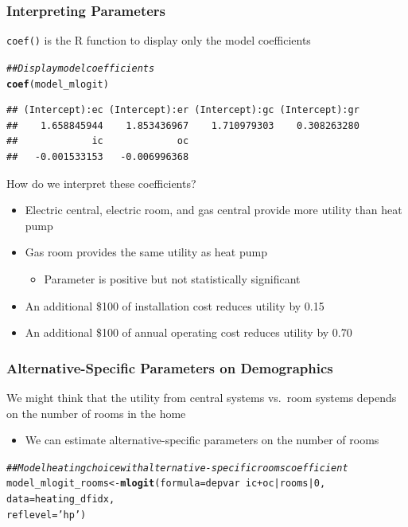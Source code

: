 \documentclass{beamer}\usepackage[]{graphicx}\usepackage[]{color}
\makeatletter
\newcommand{\hlnum}[1]{\textcolor[rgb]{0.686,0.059,0.569}{#1}}%
\newcommand{\hlstr}[1]{\textcolor[rgb]{0.192,0.494,0.8}{#1}}%
\newcommand{\hlcom}[1]{\textcolor[rgb]{0.678,0.584,0.686}{\textit{#1}}}%
\newcommand{\hlopt}[1]{\textcolor[rgb]{0,0,0}{#1}}%
\newcommand{\hlstd}[1]{\textcolor[rgb]{0.345,0.345,0.345}{#1}}%
\newcommand{\hlkwb}[1]{\textcolor[rgb]{0.69,0.353,0.396}{#1}}%
\newcommand{\hlkwc}[1]{\textcolor[rgb]{0.333,0.667,0.333}{#1}}%
\newcommand{\hlkwd}[1]{\textcolor[rgb]{0.737,0.353,0.396}{\textbf{#1}}}%
\newenvironment{kframe}{%
 \def\at@end@of@kframe{}%
 \ifinner\ifhmode%
  \def\at@end@of@kframe{\end{minipage}}%
  \begin{minipage}{\columnwidth}%
 \fi\fi%
 \def\FrameCommand##1{\hskip\@totalleftmargin \hskip-\fboxsep
 \colorbox{shadecolor}{##1}\hskip-\fboxsep
     \hskip-\linewidth \hskip-\@totalleftmargin \hskip\columnwidth}%
 \MakeFramed {\advance\hsize-\width
   \@totalleftmargin\z@ \linewidth\hsize
   \@setminipage}}%
 {\par\unskip\endMakeFramed%
 \at@end@of@kframe}
\newenvironment{knitrout}{}{} %
\makeatother
\begin{document}
\begin{frame}[fragile]\frametitle{Interpreting Parameters}
    \texttt{coef()} is the R function to display only the model coefficients
\begin{knitrout}\footnotesize
{}\color{fgcolor}\begin{kframe}
\begin{alltt}
\hlcom{## Display model coefficients}
\hlkwd{coef}\hlstd{(model_mlogit)}
\end{alltt}
\begin{verbatim}
## (Intercept):ec (Intercept):er (Intercept):gc (Intercept):gr 
##    1.658845944    1.853436967    1.710979303    0.308263280 
##             ic             oc 
##   -0.001533153   -0.006996368
\end{verbatim}
\end{kframe}
\end{knitrout}
    \vspace{2ex}
    How do we interpret these coefficients?
    \begin{itemize}
        \item Electric central, electric room, and gas central provide more utility than heat pump
        \item Gas room provides the same utility as heat pump
        \begin{itemize}
        	\item Parameter is positive but not statistically significant
        \end{itemize}
        \item An additional \$100 of installation cost reduces utility by 0.15
        \item An additional \$100 of annual operating cost reduces utility by 0.70
    \end{itemize}
\end{frame}

\begin{frame}[fragile]\frametitle{Alternative-Specific Parameters on Demographics}
	We might think that the utility from central systems vs.\ room systems depends on the number of rooms in the home
	\begin{itemize}
		\item We can estimate alternative-specific parameters on the number of rooms
	\end{itemize}
\begin{knitrout}\footnotesize
{}\color{fgcolor}\begin{kframe}
\begin{alltt}
\hlcom{## Model heating choice with alternative-specific rooms coefficient}
\hlstd{model_mlogit_rooms} \hlkwb{<-} \hlkwd{mlogit}\hlstd{(}\hlkwc{formula} \hlstd{= depvar} \hlopt{~} \hlstd{ic} \hlopt{+} \hlstd{oc} \hlopt{|} \hlstd{rooms} \hlopt{|} \hlnum{0}\hlstd{,}
                             \hlkwc{data} \hlstd{= heating_dfidx,}
                             \hlkwc{reflevel} \hlstd{=} \hlstr{'hp'}\hlstd{)}
\end{alltt}
\end{kframe}
\end{knitrout}
\end{frame}
\end{document}
